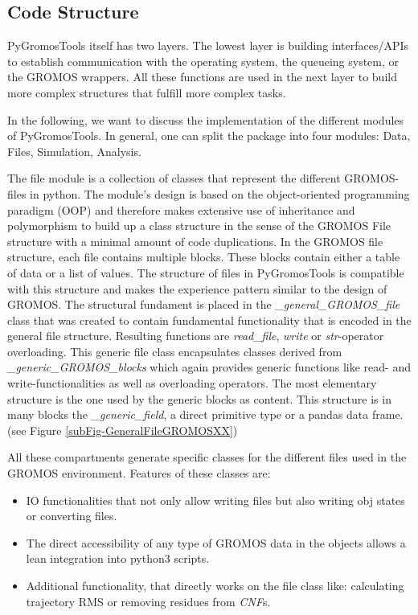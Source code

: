 \subsection{Code Structure}
PyGromosTools itself has two layers. 
The lowest layer is building interfaces/APIs to establish communication with the operating system, the queueing system, or the GROMOS wrappers. All these functions are used in the next layer to build more complex structures that fulfill more complex tasks. 

In the following, we want to discuss the implementation of the different modules of PyGromosTools. In general, one can split the package into four modules: Data, Files, Simulation, Analysis.  


The file module is a collection of classes that represent the different GROMOS-files in python. The module's design is based on the object-oriented programming paradigm (OOP) and therefore makes extensive use of inheritance and polymorphism to build up a class structure in the sense of the GROMOS File structure with a minimal amount of code duplications.
In the GROMOS file structure, each file contains multiple blocks. These blocks contain either a table of data or a  list of values. The structure of files in PyGromosTools is compatible with this structure and makes the experience pattern similar to the design of GROMOS. The structural fundament is placed in the \textit{\_general\_GROMOS\_file} class that was created to contain fundamental functionality that is encoded in the general file structure. Resulting functions are \textit{read\_file}, \textit{write} or \textit{str}-operator overloading.
This generic file class encapsulates classes derived from \textit{\_generic\_GROMOS\_blocks} which again provides generic functions like read-  and write-functionalities as well as overloading operators. 
The most elementary structure is the one used by the generic blocks as content. This structure is in many blocks the \textit{\_generic\_field}, a direct primitive type or a pandas data frame. (see Figure \ref{subFig-GeneralFileGROMOSXX})

All these compartments generate specific classes for the different files used in the GROMOS environment. Features of these classes are: 
\begin{itemize}
    \item IO functionalities that not only allow writing files but also writing obj states or converting files.
    \item The direct accessibility of any type of GROMOS data in the objects allows a lean integration into python3 scripts.
    \item Additional functionality, that directly works on the file class like: calculating trajectory RMS or removing residues from \textit{CNF}s.
\end{itemize}

